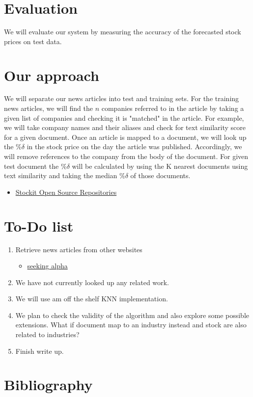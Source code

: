 \documentclass[11pt,letterpaper]{article}
\newcommand{\blue}[1]{\textcolor{RoyalBlue}{#1}}
\newcommand{\instructions}[1]{\blue{\textit{#1}}}
\renewcommand{\instructions}[1]{}
\begin{document}
\section*{Evaluation}
  We will evaluate our system by measuring the accuracy of the forecasted
  stock prices on test data.

\section*{Our approach}
  We will separate our news articles into test and training sets. For the training news
  articles, we will find the $n$ companies referred to in the article by taking a given
  list of companies and checking it is "matched" in the article. For example, we will
  take company names and their aliases and check for text similarity score for a given
  document. Once an article is mapped to a document, we will look up the $\%\delta$ in
  the stock price on the day the article was published. Accordingly, we will remove references
  to the company from the body of the document. For given test document the $\%\delta$
  will be calculated by using the K nearest documents using text similarity
  and taking the median $\%\delta$ of those documents.
  \begin{itemize}
    \item \href{ https://github.com/stockit } { Stockit Open Source Repositories }
  \end{itemize}
\instructions{Describe how you want to tackle this task}

\section*{To-Do list}
\instructions{Get started by making a to-do list. If you have a group
  project: who will do what? Set yourself deadlines. Here are a few
  items that might appear on your to-do list}
\begin{enumerate}
\item Retrieve news articles from other websites
	\begin{itemize}
		\item \href{ http://seekingalpha.com/ } { seeking alpha }
	\end{itemize}
\item We have not currently looked up any related work.
\item We will use am off the shelf KNN implementation.
\item We plan to check the validity of the algorithm and also explore some possible
  extensions. What if document map to an industry instead and stock are also related
  to industries?
\item Finish write up.
\end{enumerate}

\section*{Bibliography}
{}

\end{document}
